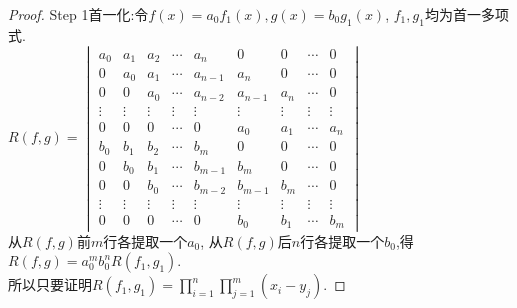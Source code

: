 \begin{proof}
  {\heiti Step 1}首一化:令$f(x)=a_0f_1(x), g(x)=b_0g_1(x)$, $f_1, g_1$均为首一多项式.\\
  $R(f,g)=
  \begin{vmatrix}
    a_0 & a_1 & a_2 & \cdots & a_n & 0 & 0 & \cdots & 0 \\
    0 & a_0 & a_1 & \cdots & a_{n-1} & a_n & 0 & \cdots & 0 \\
    0 & 0 & a_0 & \cdots & a_{n-2} & a_{n-1} & a_n & \cdots & 0 \\
    \vdots&\vdots&\vdots&\vdots&\vdots&\vdots&\vdots&\vdots&\vdots\\
    0 & 0 & 0 & \cdots & 0 & a_0 & a_1 & \cdots & a_n \\
    b_0 & b_1 & b_2 & \cdots & b_m & 0 & 0 & \cdots & 0 \\
    0 & b_0 & b_1 & \cdots & b_{m-1} & b_m & 0 & \cdots & 0 \\
    0 & 0 & b_0 & \cdots & b_{m-2} & b_{m-1} & b_m & \cdots & 0 \\
    \vdots&\vdots&\vdots&\vdots&\vdots&\vdots&\vdots&\vdots&\vdots\\
    0 & 0 & 0 & \cdots & 0 & b_0 & b_1 & \cdots & b_m
  \end{vmatrix}$\\
  从$R(f,g)$前$m$行各提取一个$a_0$, 从$R(f,g)$后$n$行各提取一个$b_0$,得
  $R(f,g)= a_0^mb_0^nR(f_1,g_1)$.\\
  所以只要证明$R(f_1,g_1)=\prod\limits_{i=1}^n\prod\limits_{j=1}^m(x_i-y_j)$.


\end{proof}
